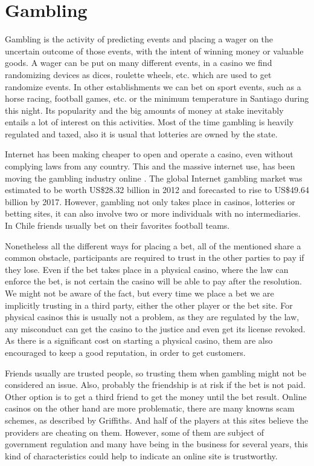 \section{Gambling} \label{gambling}
Gambling is the activity of predicting events and placing a wager on the
  uncertain outcome of those events, with the intent of winning money or
  valuable goods.
A wager can be put on many different events, in a casino we find randomizing
  devices as dices, roulette wheels, etc. which are used to get randomize
  events. In other establishments we can bet on sport events, such as a horse
  racing, football games, etc. or the minimum temperature in Santiago during
  this night.
Its popularity and the big amounts of money at stake
  inevitably entails a lot of interest on this activities. Most of the time
  gambling is heavily regulated and taxed, also it is usual that lotteries are
  owned by the state.

Internet has been making cheaper to open and operate a casino, even without
  complying laws from any country.  This and the massive internet use, has been
  moving the gambling industry online\cite{shelat2002makes}
  \cite{griffiths2008internet}. The global Internet gambling market was
  estimated to be worth US\$28.32 billion in 2012 and forecasted to rise to
  US\$49.64 billion by 2017\cite{gainsbury2015risky}.
However, gambling not only takes place in casinos, lotteries or betting sites,
  it can also involve two or more individuals with no intermediaries. In Chile
  friends usually bet on their favorites football teams.

Nonetheless all the different ways for placing a bet, all of the mentioned
  share a common obstacle, participants are required to trust in the other
  parties to pay if they lose.
  Even if the bet takes place in a physical casino, where the law can enforce
  the bet, is not certain the casino will be able to pay after the resolution.
We might not be aware of the fact, but every time we place a bet we are
  implicitly trusting in a third party, either the other player or the bet
  site. For physical casinos this is usually not a problem, as they are
  regulated by the law, any misconduct can get the casino to the justice and
  even get its license revoked. As there is a significant cost on starting a
  physical casino, them are also encouraged to keep a good reputation, in order
  to get customers.

Friends usually are trusted people, so trusting them when gambling might not
  be considered an issue. Also, probably the friendship is at risk if the bet
  is not paid. Other option is to get a third friend to get the money until the
  bet result.
Online casinos on the other hand are more problematic, there are many knowns
  scam schemes, as described by Griffiths\cite{griffiths2010crime}. And
  half of the players at this sites believe the providers are cheating on
  them\cite{mcmullan2010online}. However, some of them are subject of
  government regulation and many have being in the business for several years,
  this kind of characteristics could help to indicate an online site is
  trustworthy.

